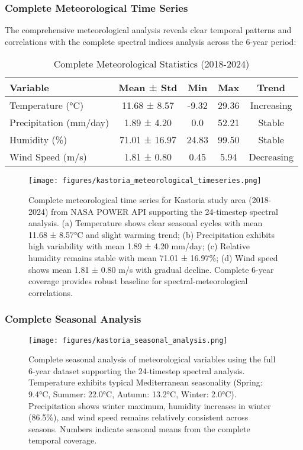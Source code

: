\documentclass[a4paper,12pt]{article}
\begin{document}
\subsubsection{Complete Meteorological Time Series}

The comprehensive meteorological analysis reveals clear temporal patterns and correlations
with the complete spectral indices analysis across the 6-year period:

\begin{table}[H]
    \centering
    \caption{Complete Meteorological Statistics (2018-2024)}
    \begin{tabular}{@{}lcccc@{}}
        \toprule
        Variable               & Mean ± Std   & Min  & Max  & Trend      \\
        \midrule
        Temperature (°C)       & 11.68 ± 8.57 & -9.32 & 29.36 & Increasing \\
        Precipitation (mm/day) & 1.89 ± 4.20  & 0.0  & 52.21 & Stable     \\
        Humidity (\%)          & 71.01 ± 16.97& 24.83 & 99.50 & Stable     \\
        Wind Speed (m/s)       & 1.81 ± 0.80  & 0.45 & 5.94 & Decreasing \\
        \bottomrule
    \end{tabular}
\end{table}

\begin{figure}[H]
    \centering
    \texttt{[image: figures/kastoria\_meteorological\_timeseries.png]}
    \caption{Complete meteorological time series for Kastoria study area (2018-2024) from NASA POWER API supporting the 24-timestep spectral analysis. (a) Temperature shows clear seasonal cycles with mean 11.68 ± 8.57°C and slight warming trend; (b) Precipitation exhibits high variability with mean 1.89 ± 4.20 mm/day; (c) Relative humidity remains stable with mean 71.01 ± 16.97\%; (d) Wind speed shows mean 1.81 ± 0.80 m/s with gradual decline. Complete 6-year coverage provides robust baseline for spectral-meteorological correlations.}
    \label{fig:met_timeseries}
\end{figure}

\subsubsection{Complete Seasonal Analysis}

\begin{figure}[H]
    \centering
    \texttt{[image: figures/kastoria\_seasonal\_analysis.png]}
    \caption{Complete seasonal analysis of meteorological variables using the full 6-year dataset supporting the 24-timestep spectral analysis. Temperature exhibits typical Mediterranean seasonality (Spring: 9.4°C, Summer: 22.0°C, Autumn: 13.2°C, Winter: 2.0°C). Precipitation shows winter maximum, humidity increases in winter (86.5\%), and wind speed remains relatively consistent across seasons. Numbers indicate seasonal means from the complete temporal coverage.}
    \label{fig:seasonal}
\end{figure}
\end{document}
